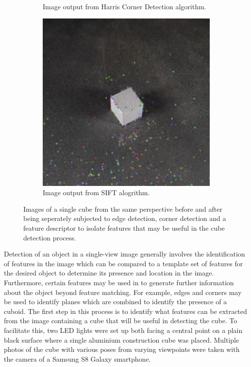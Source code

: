 \begin{figure}[H]
\begin{subfigure}[b]{0.49\textwidth}
         \caption{Image output from Harris Corner Detection algorithm.}
         \label{fig:harris-corner-image}
    \end{subfigure}
    \begin{subfigure}[b]{0.49\textwidth}
        \includegraphics[width=\textwidth]{figures/202105/sift-cube.png}
        \caption{Image output from \ac{SIFT} alogrithm.}
        \label{fig:sift-image}
    \end{subfigure}
    \captionsetup{singlelinecheck = false, justification=justified}
    \caption{Images of a single cube from the same perspective before and after being seperately subjected to edge detection, corner detection and a feature descriptor to isolate features that may be useful in the cube detection process.}
    \label{fig:feature-detectors}
\end{figure}

Detection of an object in a single-view image generally involves the identification of features in the image which can be compared to a template set of features for the desired object to determine its presence and location in the image. Furthermore, certain features may be used in to generate further information about the object beyond feature matching. For example, edges and corners may be used to identify planes which are combined to identify the presence of a cuboid. The first step in this process is to identify what features can be extracted from the image containing a cube that will be useful in detecting the cube. To facilitate this, two LED lights were set up both facing a central point on a plain black surface where a single aluminium construction cube was placed. Multiple photos of the cube with various poses from varying viewpoints were taken with the camera of a Samsung S8 Galaxy smartphone.

